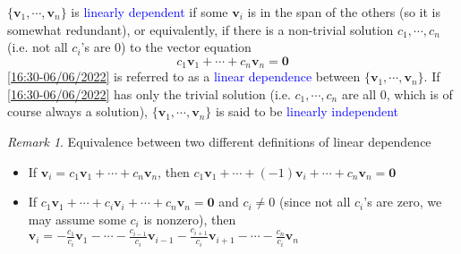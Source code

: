 \documentclass{beamer}
\theoremstyle{definition}
\theoremstyle{remark}
\newtheorem*{remark}{Remark}
\begin{document}
\begin{frame}[t]
\begin{definition}
$\{\mathbf v_1,\cdots,\mathbf v_n\}$ is \textcolor{blue}{linearly dependent} if some $\mathbf v_i$ is in the span of the others (so it is somewhat redundant)\pause, or equivalently, if there is a non-trivial solution $c_1,\cdots,c_n$ (i.e. not all $c_i$'s are 0) to the vector equation
\begin{equation}\label{16:30-06/06/2022}
c_1\mathbf v_1+\cdots+c_n\mathbf v_n=\mathbf0
\end{equation}\pause
\eqref{16:30-06/06/2022} is referred to as a \textcolor{blue}{linear dependence} between $\{\mathbf v_1,\cdots,\mathbf v_n\}$. If \eqref{16:30-06/06/2022} has only the trivial solution (i.e. $c_1,\cdots, c_n$ are all 0, which is of course always a solution), $\{\mathbf v_1,\cdots,\mathbf v_n\}$ is said to be \textcolor{blue}{linearly independent}
\end{definition}
\pause
\begin{remark}
Equivalence between two different definitions of linear dependence
\begin{itemize}
\item If $\mathbf v_i=c_1\mathbf v_1+\cdots+c_n\mathbf v_n$, then $c_1\mathbf v_1+\cdots+(-1)\mathbf v_i+\cdots+c_n\mathbf v_n=\mathbf0$
\item If $c_1\mathbf v_1+\cdots+c_i\mathbf v_i+\cdots+c_n\mathbf v_n=\mathbf0$ and $c_i\neq0$ (since not all $c_i$'s are zero, we may assume some $c_i$ is nonzero), then $\mathbf v_i=-\frac{c_1}{c_i}\mathbf v_1-\cdots-\frac{c_{i-1}}{c_i}\mathbf v_{i-1}-\frac{c_{i+1}}{c_i}\mathbf v_{i+1}-\cdots-\frac{c_n}{c_i}\mathbf v_n$
\end{itemize}
\end{remark}
\end{frame}
\end{document}
